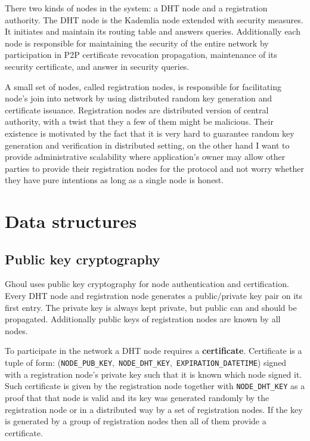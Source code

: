 There two kinds of nodes in the system: a DHT node and a registration authority.
The DHT node is the Kademlia node extended with security measures. It initiates
and maintain its routing table and answers queries. Additionally each node is
responsible for maintaining the security of the entire network by participation
in P2P certificate revocation propagation, maintenance of its security
certificate, and answer in security queries.

A small set of nodes, called registration nodes, is responsible for facilitating
node’s join into network by using distributed random key generation and
certificate issuance. Registration nodes are distributed version of central
authority, with a twist that they a few of them might be malicious. Their
existence is motivated by the fact that it is very hard to guarantee random key
generation and verification in distributed setting, on the other hand I want to
provide administrative scalability where application's owner may allow other
parties to provide their registration nodes for the protocol and not worry
whether they have pure intentions as long as a single node is honest.

\section{Data structures}

\subsection{Public key cryptography}
Ghoul uses public key cryptography for node authentication and certification.
Every DHT node and registration node generates a public/private key pair on its
first entry. The private key is always kept private, but public can and should
be propagated. Additionally public keys of registration nodes are known by all
nodes.

To participate in the network a DHT node requires a \textbf{certificate}.
Certificate is a tuple of form:
(\texttt{NODE\_PUB\_KEY},~\texttt{NODE\_DHT\_KEY},~\texttt{EXPIRATION\_DATETIME})
signed with a registration node's private key such that it is known which node
signed it. Such certificate is given by the registration node together with
\texttt{NODE\_DHT\_KEY} as a proof that that node is valid and its key was
generated randomly by the registration node or in a distributed way by a set of
registration nodes. If the key is generated by a group of registration nodes
then all of them provide a certificate.

